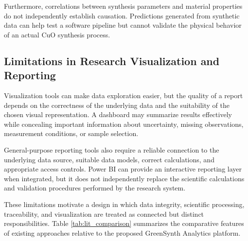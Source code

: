\documentclass[12pt,a4paper,oneside]{report}
\begin{document}
{{{Furthermore, correlations between synthesis parameters and material properties do not independently establish causation. Predictions generated from synthetic data can help test a software pipeline but cannot validate the physical behavior of an actual $\text{CuO}$ synthesis process.

\subsection{Limitations in Research Visualization and Reporting}

Visualization tools can make data exploration easier, but the quality of a report depends on the correctness of the underlying data and the suitability of the chosen visual representation. A dashboard may summarize results effectively while concealing important information about uncertainty, missing observations, measurement conditions, or sample selection.

General-purpose reporting tools also require a reliable connection to the underlying data source, suitable data models, correct calculations, and appropriate access controls. Power BI can provide an interactive reporting layer when integrated, but it does not independently replace the scientific calculations and validation procedures performed by the research system.

These limitations motivate a design in which data integrity, scientific processing, traceability, and visualization are treated as connected but distinct responsibilities. Table \ref{tab:lit_comparison} summarizes the comparative features of existing approaches relative to the proposed GreenSynth Analytics platform.

}}}
\end{document}
